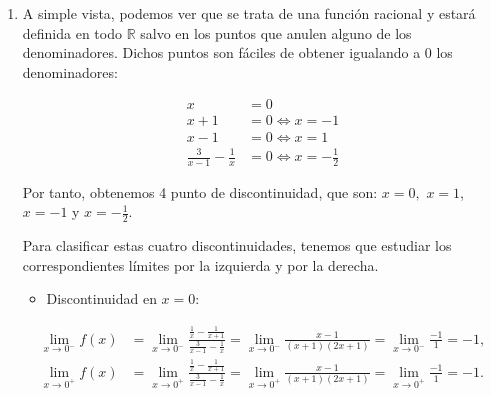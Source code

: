 \documentclass[
  spanish,
  a4paper,
]{scrreport}
\providecommand{\tightlist}{%
  \setlength{\itemsep}{0pt}\setlength{\parskip}{0pt}}
\theoremstyle{definition}
\theoremstyle{remark}
\begin{document}
\begin{tcolorbox}[enhanced jigsaw, arc=.35mm, bottomrule=.15mm, bottomtitle=1mm, breakable, colback=white, colbacktitle=quarto-callout-tip-color!10!white, colframe=quarto-callout-tip-color-frame, coltitle=black, left=2mm, leftrule=.75mm, opacityback=0, opacitybacktitle=0.6, rightrule=.15mm, title=\textcolor{quarto-callout-tip-color}{\faLightbulb}\hspace{0.5em}{Solución}, titlerule=0mm, toprule=.15mm, toptitle=1mm]

\begin{enumerate}
\def\labelenumi{\alph{enumi}.}
\item
  A simple vista, podemos ver que se trata de una función racional y
  estará definida en todo \(\mathbb{R}\) salvo en los puntos que anulen
  alguno de los denominadores. Dichos puntos son fáciles de obtener
  igualando a 0 los denominadores:

  \begin{align*}
   x &= 0 \\
   x+1 &= 0\Leftrightarrow x=-1 \\
   x-1 &= 0\Leftrightarrow x=1 \\
   \frac{3}{x-1}-\frac{1}{x} &= 0 \Leftrightarrow x=-\frac{1}{2}
   \end{align*}

  Por tanto, obtenemos 4 punto de discontinuidad, que son: \(x=0,\)
  \(x=1\), \(x=-1\) y \(x=-\frac{1}{2}\).

  Para clasificar estas cuatro discontinuidades, tenemos que estudiar
  los correspondientes límites por la izquierda y por la derecha.

  \begin{itemize}
  \tightlist
  \item
    Discontinuidad en \(x=0\):
  \end{itemize}

  \begin{align*}
   \lim_{x\rightarrow 0^{-}}f(x) &= \lim_{x\rightarrow 0^{-}}\frac{\frac{1}{x}-\frac{1}{x+1}}{\frac{3}{x-1}-\frac{1}{x}} = \lim_{x\rightarrow 0^{-}}\frac{x-1}{\left( x+1\right) \left( 2x+1\right) } = \lim_{x\rightarrow 0^{-}}\frac{-1}{1}=-1, \\
   \lim_{x\rightarrow 0^{+}}f(x) &= \lim_{x\rightarrow 0^{+}}\frac{\frac{1}{x}-\frac{1}{x+1}}{\frac{3}{x-1}-\frac{1}{x}} = \lim_{x\rightarrow 0^{+}}\frac{x-1}{\left( x+1\right) \left( 2x+1\right) } = \lim_{x\rightarrow 0^{+}}\frac{-1}{1}=-1.
   \end{align*}


\end{enumerate}
\end{tcolorbox}
\end{document}
